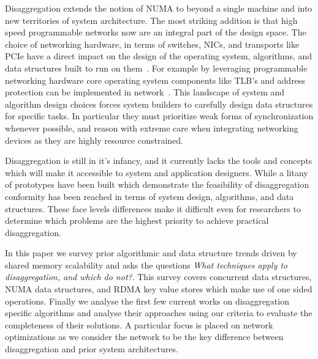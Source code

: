 Disaggregation extends the notion of NUMA to beyond a single machine and into
new territories of system architecture. The most striking addition is that high
speed programmable networks now are an integral part of the design space. The
choice of networking hardware, in terms of switches, NICs, and transports like
PCIe have a direct impact on the design of the operating system, algorithms, and
data structures built to run on
them~\cite{dredbox,firebox,machine,legoos,supernic}. For example by leveraging
programmable networking hardware core operating system components like TLB's and
address protection can be implemented in network~\cite{mind}.  This landscape of
system and algorithm design choices forces system builders to carefully design
data structures for specific tasks.  In particular they must prioritize weak
forms of synchronization whenever possible, and reason with extreme care when
integrating networking devices as they are highly resource constrained.


Disaggregation is still in it's infancy, and it currently lacks the tools and
concepts which will make it accessible to system and application designers.
While a litany of prototypes have been built which demonstrate the feasibility
of
disaggregation~\cite{infiniswap,fastswap,leap,legoos,aifm,kona,reigons,software-far,lite,semeru}
conformity has been reached in terms of system design, algorithms, and data
structures. These face levels differences make it difficult even for researchers
to determine which problems are the highest priority to achieve practical
disaggregation.

In this paper we survey prior algorithmic and data structure trends driven by
shared memory scalability and asks the questions \textit{What techniques apply
to disaggregation, and which do not?}. This survey covers concurrent data
structures, NUMA data structures, and RDMA key value stores which make use of
one sided operations.  Finally we analyse the first few current works on
disaggregation specific algorithms and analyse their approaches using our
criteria to evaluate the completeness of their solutions.  A particular focus is
placed on network optimizations as we consider the network to be the key
difference between disaggregation and prior system architectures.

